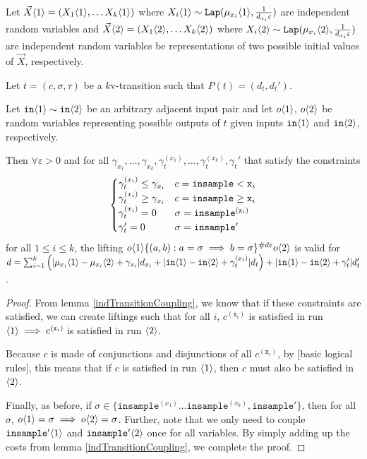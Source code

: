 \begin{lemma}\label{mvParallelCouplingsLemma}
    Let $\vec{X}\brangle{1} = (X_1\brangle{1}, \ldots X_k\brangle{1})$ where $X_i\brangle{1}\sim \Lap(\mu_{x_i}\brangle{1}, \frac{1}{d_{x_i}\varepsilon})$ are independent random variables and $\vec{X}\brangle{2} = (X_1\brangle{2}, \ldots X_k\brangle{2})$ where $X_i\brangle{2}\sim \Lap(\mu_{x_i}\brangle{2}, \frac{1}{d_{x_i}\varepsilon})$ are independent random variables be representations of two possible initial values of $\vec{X}$, respectively.

    Let $t = (c, \sigma, \tau)$ be a $k$v-transition such that $P(t) = (d_t, d_t')$.

    Let $\texttt{in}\brangle{1}\sim\texttt{in}\brangle{2}$ be an arbitrary adjacent input pair and let $o\brangle{1}$, $o\brangle{2}$ be random variables representing possible outputs of $t$ given inputs $\texttt{in}\brangle{1}$ and $\texttt{in}\brangle{2}$, respectively. 

    Then $\forall \varepsilon>0$ and for all $\gamma_{x_1}, \ldots, \gamma_{x_k}, \gamma_t^{(x_1)}, \ldots, \gamma_t^{(x_k)}, \gamma_t'$ that satisfy the constraints \[
        \begin{cases}
            \gamma_t^{(x_i)}\leq\gamma_{x_i} & c = \lguard[\texttt{x}_i]\\
            \gamma_t^{(x_i)}\geq\gamma_{x_i} & c = \gguard[\texttt{x}_i]\\
            \gamma_t^{(x_i)}=0 & \sigma = \texttt{insample}^{(\texttt{x}_i)}\\
            \gamma_t'=0 & \sigma = \texttt{insample}'
      \end{cases}
      \] for all $1\leq i\leq k$, the lifting $o\brangle{1}\{(a, b): a=\sigma\implies b=\sigma\}^{\#d\varepsilon}o\brangle{2}$ is valid for 
      $d = \sum_{i=1}^k\left(|\mu_{x_i}\brangle{1}-\mu_{x_i}\brangle{2}+\gamma_{x_i}|d_{x_i}+|\texttt{in}\brangle{1}-\texttt{in}\brangle{2}+\gamma_t^{(x_i)}|d_t\right)+|\texttt{in}\brangle{1}-\texttt{in}\brangle{2}+\gamma_t'|d_t'$.
\end{lemma}
\begin{proof}
    From lemma \ref{indTransitionCoupling}, we know that if these constraints are satisfied, we can create liftings such that for all $i$, $c^{(\texttt{x}_i)}$ is satisfied in run $\brangle{1}\implies c^{(\texttt{x}_i)}$ is satisfied in run $\brangle{2}$.
    
    Because $c$ is made of conjunctions and disjunctions of all $c^{(\texttt{x}_i)}$, by [basic logical rules], this means that if $c$ is satisfied in run $\brangle{1}$, then $c$ must also be satisfied in $\brangle{2}$. 

    Finally, as before, if $\sigma \in \{\texttt{insample}^{(x_1)}\ldots \texttt{insample}^{(x_k)},\texttt{insample}'\}$, then for all $\sigma$, $o\brangle{1}=\sigma \implies o\brangle{2} = \sigma$. Further, note that we only need to couple $\texttt{insample}'\brangle{1}$ and $\texttt{insample}'\brangle{2}$ once for all variables. By simply adding up the costs from lemma \ref{indTransitionCoupling}, we complete the proof.
\end{proof}

